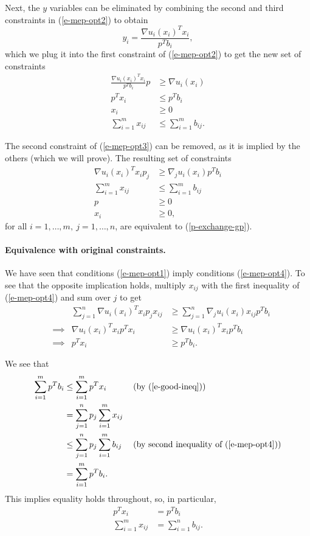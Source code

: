 \documentclass[12pt]{article}
\begin{document}
Next, the $y$ variables can be eliminated by combining the second and third
constraints in (\ref{e-mep-opt2}) to obtain
\[
y_i = \frac{\nabla u_i(x_i)^T x_i}{p^T b_i},
\]
which we plug it into the first constraint of (\ref{e-mep-opt2}) to get the new
set of constraints
\begin{equation}
\begin{aligned}
\frac{\nabla u_i(x_i)^T x_i}{p^T b_i} p &\geq \nabla u_i(x_i) \\
p^T x_i &\leq p^T b_i\\
x_i &\geq 0\\
\sum_{i=1}^m x_{ij} &\leq \sum_{i=1}^m b_{ij}.
\end{aligned}
\label{e-mep-opt3}
\end{equation}

The second constraint of (\ref{e-mep-opt3}) can be removed, as it is implied by
the others (which we will prove). The resulting set of constraints
\begin{equation}
\begin{aligned}
\nabla u_i(x_i)^T x_i p_j &\geq \nabla_j u_i(x_i) p^T b_i\\
\sum_{i=1}^m x_{ij} &\leq \sum_{i=1}^m b_{ij}\\
p &\geq 0\\
x_i &\geq 0,
\end{aligned}
\label{e-mep-opt4}
\end{equation}
for all $i=1,\ldots,m,\ j=1,\ldots,n$, are equivalent to (\ref{p-exchange-gp}).

\paragraph{Equivalence with original constraints.}
We have seen that conditions (\ref{e-mep-opt1}) imply conditions (\ref{e-mep-opt4}).
To see that the opposite implication holds,
multiply $x_{ij}$ with the first inequality of (\ref{e-mep-opt4}) and sum over $j$ to get
\begin{align}
&&\sum_{j=1}^n \nabla u_i(x_i)^T x_i p_j x_{ij} &\geq \sum_{j=1}^n \nabla_j u_i(x_i) x_{ij} p^T b_i \nonumber \\
&\implies & \nabla u_i(x_i)^T x_i p^T x_i &\geq \nabla u_i(x_i)^T x_i p^T b_i \nonumber\\
&\implies & p^T x_i &\geq p^T b_i. \label{e-good-ineq}
\end{align}

We see that
\begin{align*}
\sum_{i=1}^m p^T b_i &\leq \sum_{i=1}^m p^T x_i\ &&\text{(by (\ref{e-good-ineq}))}\\
&= \sum_{j=1}^n p_j \sum_{i=1}^m x_{ij} &&\\
&\leq \sum_{j=1}^n p_j \sum_{i=1}^m b_{ij}\ &&\text{(by second inequality of (\ref{e-mep-opt4}))}\\
&= \sum_{i=1}^m p^T b_i.&&
\end{align*}
This implies equality holds throughout, so, in particular,
\begin{align}
p^T x_i &= p^T b_i \label{e-spending}\\
\sum_{i=1}^m x_{ij} &= \sum_{i=1}^n b_{ij} \label{e-equilibrium}.
\end{align}
\end{document}

